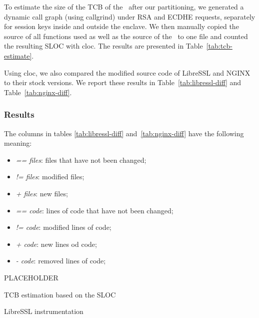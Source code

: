 \documentclass[../../../main.tex]{subfiles}
\begin{document}
\label{sec:tcb-analysis}
To estimate the size of the TCB of the \enclaveprogram~after our partitioning,
we generated a dynamic call graph (using callgrind) under RSA and ECDHE
requests, separately for session keys inside and outside the enclave. We then
manually copied the source of all functions used as well as the source of the
\enclaveprogram~to one file and counted the resulting SLOC with cloc. The
results are presented in Table~\ref{tab:tcb-estimate}.

Using cloc, we also compared the modified source code of LibreSSL and NGINX to
their stock versions. We report these results in Table~\ref{tab:libressl-diff}
and Table~\ref{tab:nginx-diff}.

\subsubsection*{Results}
The columns in tables \ref{tab:libressl-diff} and~\ref{tab:nginx-diff} have the following meaning:
\begin{itemize}
  \item \textit{\footnotesize == files}: files that have not been changed;
  \item \textit{\footnotesize != files}: modified files;
  \item \textit{\footnotesize + files}: new files;
  \item \textit{\footnotesize == code}: lines of code that have not been
    changed;
  \item \textit{\footnotesize != code}:  modified lines of code;
  \item \textit{\footnotesize + code}: new lines od code;
  \item \textit{\footnotesize - code}: removed lines of code;
\end{itemize}

\begin{table}[H]
  \center
  \footnotesize
  PLACEHOLDER
  \caption{TCB estimation based on the SLOC}
  \label{tab:tcb-estimate}
\end{table}

\begin{table}[H]
  \caption{LibreSSL instrumentation}
  \label{tab:libressl-diff}
\end{table}
\end{document}

